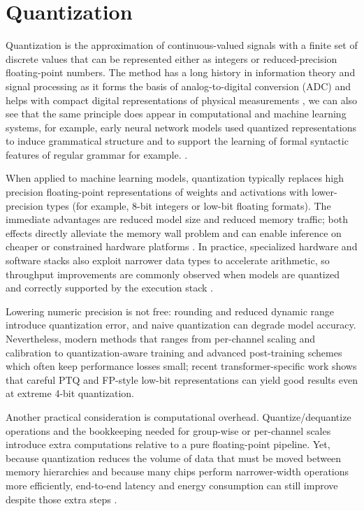 \section{Quantization}


Quantization is the approximation of continuous-valued signals with a finite set of discrete values that can be represented either as integers or reduced-precision floating-point numbers. The method has a long history in information theory and signal processing \cite{gray1998quantization} as it forms the basis of analog-to-digital conversion (ADC) and helps with compact digital representations of physical measurements \cite{pelgrom2010adc}, we can also see that the same principle does appear in computational and machine learning systems, for example, early neural network models used quantized representations to induce grammatical structure and to support the learning of formal syntactic features of regular grammar for example. \cite{giles-miller-gi-1991}.

When applied to machine learning models, quantization typically replaces high precision floating-point representations of weights and activations with lower-precision types (for example, 8-bit integers or low-bit floating formats). The immediate advantages are reduced model size and reduced memory traffic; both effects directly alleviate the memory wall problem and can enable inference on cheaper or constrained hardware platforms \cite{krishnamoorthi2018,baum2023fitting}. In practice, specialized hardware and software stacks also exploit narrower data types to accelerate arithmetic, so throughput improvements are commonly observed when models are quantized and correctly supported by the execution stack \cite{krishnamoorthi2018,baum2023fitting}.

Lowering numeric precision is not free: rounding and reduced dynamic range introduce quantization error, and naive quantization can degrade model accuracy. Nevertheless, modern methods that ranges from per-channel scaling and calibration to quantization-aware training and advanced post-training schemes which often keep performance losses small; recent transformer-specific work shows that careful PTQ and FP-style low-bit representations can yield good results even at extreme 4-bit quantization. \cite{liu-etal-2023-llm}

Another practical consideration is computational overhead. Quantize/dequantize operations and the bookkeeping needed for group-wise or per-channel scales introduce extra computations relative to a pure floating-point pipeline. Yet, because quantization reduces the volume of data that must be moved between memory hierarchies and because many chips perform narrower-width operations more efficiently, end-to-end latency and energy consumption can still improve despite those extra steps \cite{krishnamoorthi2018,baum2023fitting}.

